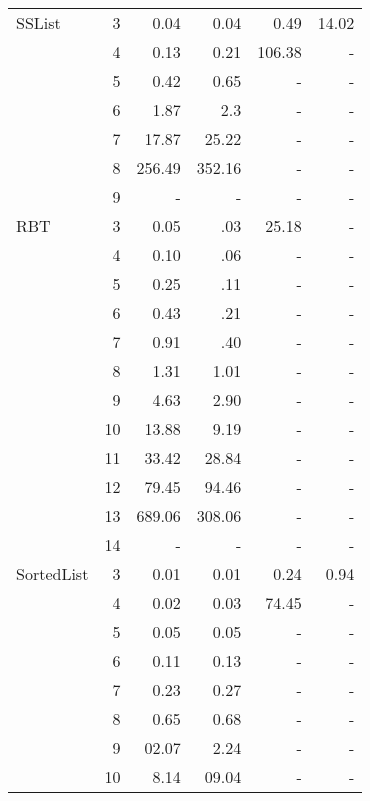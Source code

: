 \begin{table}[H]
\begin{tabular}{ l r | r | r | r | r  }
  \midrule
  SSList
&	3	&	0.04	&	0.04	&	0.49	&	14.02	\\
&	4	&	0.13	&	0.21	&	106.38	&	-	\\
&	5	&	0.42	&	0.65	&	-	&	-	\\
&	6	&	1.87	&	2.3	&	-	&	-	\\
&	7	&	17.87	&	25.22	&	-	&	-	\\
&	8	&	256.49	&	352.16	&	-	&	-	\\
&	9	&	-	&	-	&	-	&	-	\\
  \midrule
  RBT
&	3	&	0.05	&	.03	&	25.18	&	-	\\
&	4	&	0.10	&	.06	&	-	&	-	\\
&	5	&	0.25	&	.11	&	-	&	-	\\
&	6	&	0.43	&	.21	&	-	&	-	\\
&	7	&	0.91	&	.40	&	-	&	-	\\
&	8	&	1.31	&	1.01	&	-	&	-	\\
&	9	&	4.63	&	2.90	&	-	&	-	\\
&	10	&	13.88	&	9.19	&	-	&	-	\\
&	11	&	33.42	&	28.84	&	-	&	-	\\
&	12	&	79.45	&	94.46	&	-	&	-	\\
&	13	&	689.06	&	308.06	&	-	&	-	\\
&	14	&	-	&	-	&	-	&	-	\\
  \midrule
  SortedList
&	3	&	0.01	&	0.01	&	0.24	&	0.94	\\
&	4	&	0.02	&	0.03	&	74.45	&	-	\\
&	5	&	0.05	&	0.05	&	-	&	-	\\
&	6	&	0.11	&	0.13	&	-	&	-	\\
&	7	&	0.23	&	0.27	&	-	&	-	\\
&	8	&	0.65	&	0.68	&	-	&	-	\\
&	9	&	02.07	&	2.24	&	-	&	-	\\
&	10	&	8.14	&	09.04	&	-	&	-	\\
  \bottomrule
\end{tabular}
\end{table}


